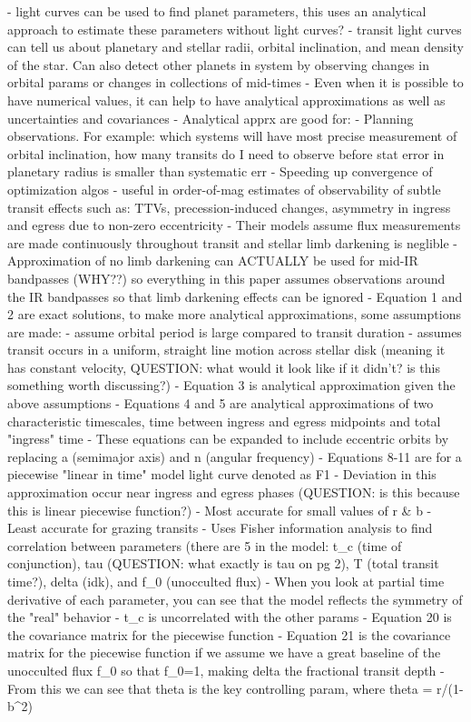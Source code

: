 \documentclass[oneside,12pt]{amsart}
\numberwithin{page}{section}
\begin{document}
- light curves can be used to find planet parameters, this uses an analytical approach to estimate these parameters without light curves?
- transit light curves can tell us about planetary and stellar radii, orbital inclination, and mean density of the star. Can also detect other planets in system by observing changes in orbital params or changes in collections of mid-times
- Even when it is possible to have numerical values, it can help to have analytical approximations as well as uncertainties and covariances
- Analytical apprx are good for:
    - Planning observations. For example: which systems will have most precise measurement of orbital inclination, how many transits do I need to observe before stat error in planetary radius is smaller than systematic err
    - Speeding up convergence of optimization algos
    - useful in order-of-mag estimates of observability of subtle transit effects such as: TTVs, precession-induced changes, asymmetry in ingress and egress due to non-zero eccentricity
- Their models assume flux measurements are made continuously throughout transit and stellar limb darkening is neglible
- Approximation of no limb darkening can ACTUALLY be used for mid-IR bandpasses (WHY??) so everything in this paper assumes observations around the IR bandpasses so that limb darkening effects can be ignored
- Equation 1 and 2 are exact solutions, to make more analytical approximations, some assumptions are made:
    - assume orbital period is large compared to transit duration
    - assumes transit occurs in a uniform, straight line motion across stellar disk (meaning it has constant velocity, QUESTION: what would it look like if it didn't? is this something worth discussing?)
- Equation 3 is analytical approximation given the above assumptions
- Equations 4 and 5 are analytical approximations of two characteristic timescales, time between ingress and egress midpoints and total "ingress" time
- These equations can be expanded to include eccentric orbits by replacing a (semimajor axis) and n (angular frequency)
- Equations 8-11 are for a piecewise "linear in time" model light curve denoted as F1
    - Deviation in this approximation occur near ingress and egress phases (QUESTION: is this because this is linear piecewise function?)
    - Most accurate for small values of r & b
    - Least accurate for grazing transits
- Uses Fisher information analysis to find correlation between parameters (there are 5 in the model: t_c (time of conjunction), tau (QUESTION: what exactly is tau on pg 2), T (total transit time?), delta (idk), and f_0 (unocculted flux)
    - When you look at partial time derivative of each parameter, you can see that the model reflects the symmetry of the "real" behavior
    - t_c is uncorrelated with the other params
- Equation 20 is the covariance matrix for the piecewise function
- Equation 21 is the covariance matrix for the piecewise function if we assume we have a great baseline of the unocculted flux f_0 so that f_0=1, making delta the fractional transit depth
    - From this we can see that theta is the key controlling param, where theta = r/(1-b^2)
\end{document}
